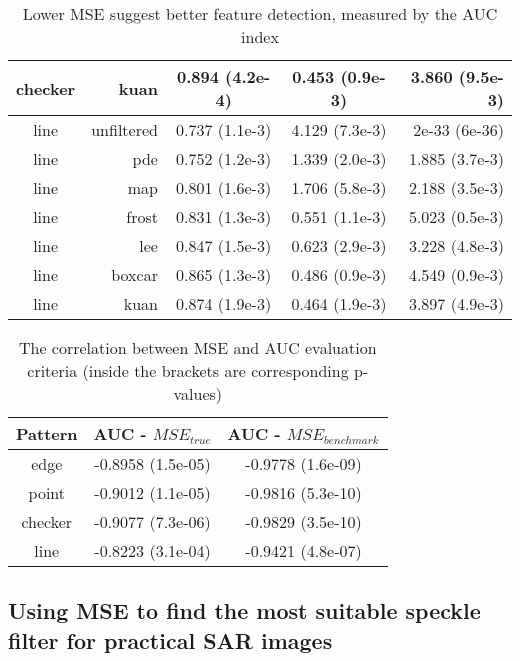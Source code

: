 \begin{table}
\begin{tabular}{c|r|c|c|r}
 checker  &  kuan  &  0.894 (4.2e-4)  &  0.453 (0.9e-3)  &  3.860 (9.5e-3)\\
\hline
 line  &  unfiltered  &  0.737 (1.1e-3)  &  4.129 (7.3e-3)  &  2e-33 (6e-36)\\
 line  &  pde  &  0.752 (1.2e-3)  &  1.339 (2.0e-3)  &  1.885 (3.7e-3)\\
 line  &  map  &  0.801 (1.6e-3)  &  1.706 (5.8e-3)  &  2.188 (3.5e-3)\\
 line  &  frost  &  0.831 (1.3e-3)  &  0.551 (1.1e-3)  &  5.023 (0.5e-3)\\
 line  &  lee  &  0.847 (1.5e-3)  &  0.623 (2.9e-3)  &  3.228 (4.8e-3)\\
 line  &  boxcar  &  0.865 (1.3e-3)  &  0.486 (0.9e-3)  &  4.549 (0.9e-3)\\
 line  &  kuan  &  0.874 (1.9e-3)  &  0.464 (1.9e-3)  &  3.897 (4.9e-3)\\
\hline
\end{tabular}

\caption{Lower MSE suggest better feature detection, measured by the AUC index}
\label{tab:mse_auc_in_log_domain}
\end{table}

\begin{table}
\centering
\begin{tabular}{c|c|c}
Pattern  & AUC - $MSE_{true}$  & AUC - $MSE_{benchmark}$  \\
\hline
edge & -0.8958 (1.5e-05) &   -0.9778  (1.6e-09) \\
point &     -0.9012   (1.1e-05)   &    -0.9816        (5.3e-10) \\
checker &   -0.9077     (7.3e-06)  &  -0.9829       (3.5e-10) \\
line &      -0.8223     (3.1e-04)  &   -0.9421       (4.8e-07) \\
\hline
\end{tabular}

\caption{The correlation between MSE and AUC evaluation criteria (inside the brackets are corresponding p-values)}
\label{tab:mse_auc_corr_coeff}
\end{table}

\subsection{Using MSE to find the most suitable speckle filter for practical SAR images}
\label{sec:practical_conjecture}

